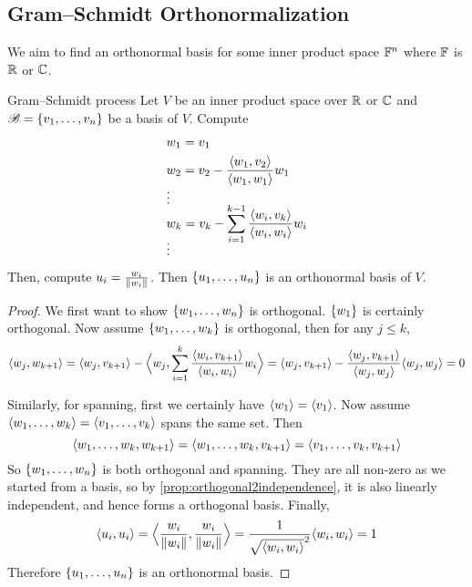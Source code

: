 \documentclass{styles/tufte}
\begin{document}
\subsection{Gram--Schmidt Orthonormalization}

  We aim to find an orthonormal basis for some inner product space $\mathbb{F}^n$ where $\mathbb{F}$ is $\mathbb{R}$ or $\mathbb{C}$.
  
  \begin{theorem}{Gram--Schmidt process}{}
    Let $V$ be an inner product space over $\mathbb{R}$ or $\mathbb{C}$ and $\mathscr{B} = \set{v_1, \dots, v_n}$ be a basis of $V$. Compute
    \begin{align*}
      &w_1 = v_1 \\
      &w_2 = v_2 - \frac{\langle w_1, v_2 \rangle}{\langle w_1, w_1 \rangle} w_1 \\[-0.5em]
      &\vdots \\[-0.75em]
      &w_k = v_k - \sum_{i=1}^{k-1} \frac{\langle w_i, v_k \rangle}{\langle w_i, w_i \rangle} w_i \\[-1em]
      &\vdots
    \end{align*}
    Then, compute $u_i = \frac{w_i}{\norm{w_i}}$. Then $\set{u_1, \dots, u_n}$ is an orthonormal basis of $V$.
  \end{theorem}
  \begin{proof}
    We first want to show $\set{w_1, \dots, w_n}$ is orthogonal. $\set{w_1}$ is certainly orthogonal. Now assume $\set{w_1, \dots, w_k}$ is orthogonal, then for any $j \leqslant k$,
    \[ \abrak{w_j, w_{k+1}} = \abrak{w_j, v_{k+1}} - \abrak[\Big]{w_j, \sum_{i=1}^k \frac{\abrak{w_i, v_{k+1}}}{\abrak{w_i, w_i}} w_i} = \abrak{w_j, v_{k+1}} - \frac{\abrak{w_j, v_{k+1}}}{\abrak{w_j, w_j}} \abrak{w_j, w_j} = 0 \]
    
    Similarly, for spanning, first we certainly have $\langle w_1 \rangle = \langle v_1 \rangle$. Now assume $\langle w_1, \dots, w_k \rangle = \langle v_1, \dots, v_k \rangle$ spans the same set. Then
    \[ \langle w_1, \dots, w_k, w_{k+1} \rangle = \langle w_1, \dots, w_k, v_{k+1} \rangle = \langle v_1, \dots, v_k, v_{k+1} \rangle \]
    So $\set{w_1, \dots, w_n}$ is both orthogonal and spanning. They are all non-zero as we started from a basis, so by \cref{prop:orthogonal2independence}, it is also linearly independent, and hence forms a orthogonal basis. Finally,
    \[ \abrak{u_i, u_i} = \abrak[\Big]{\frac{w_i}{\norm{w_i}}, \frac{w_i}{\norm{w_i}}} = \frac{1}{\sqrt{\abrak{w_i ,w_i}}^2} \abrak{w_i, w_i} = 1 \]
    Therefore $\set{u_1, \dots, u_n}$ is an orthonormal basis.
  \end{proof}
\end{document}

